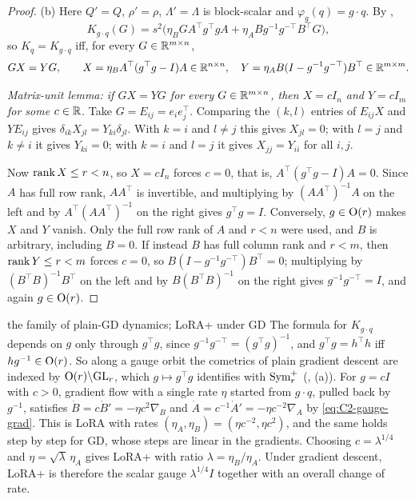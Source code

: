\begin{proof}
(b) Here $Q'=Q$, $\rho'=\rho$, $\Lambda'=\Lambda$ is block-scalar and $\varphi_g(q)=g\cdot q$. By
,
\[K_{g\cdot q}(G)=s^2\big(\eta_BGA^\top g^\top gA+\eta_ABg^{-1}g^{-\top}B^\top G\big),\]
so $K_q=K_{g\cdot q}$ iff, for every $G\in\mathbb{R}^{m\times n}$,
\[GX=YG,\qquad X=\eta_BA^\top(g^\top g-I)A\in\mathbb{R}^{n\times n},\quad Y=\eta_AB(I-g^{-1}g^{-\top})B^\top\in\mathbb{R}^{m\times m}.\]

\emph{Matrix-unit lemma: if $GX=YG$ for every $G\in\mathbb{R}^{m\times n}$, then $X=cI_n$ and $Y=cI_m$ for some $c\in\mathbb{R}$.} Take
$G=E_{ij}=e_ie_j^\top$. Comparing the $(k,l)$ entries of $E_{ij}X$ and $YE_{ij}$ gives $\delta_{ik}X_{jl}=Y_{ki}\delta_{jl}$.
With $k=i$ and $l\ne j$ this gives $X_{jl}=0$; with $l=j$ and $k\ne i$ it gives $Y_{ki}=0$; with $k=i$ and $l=j$ it gives
$X_{jj}=Y_{ii}$ for all $i,j$.

Now $\operatorname{rank} X\le r<n$, so $X=cI_n$ forces $c=0$, that is, $A^\top(g^\top g-I)A=0$. Since $A$ has full row rank, $AA^\top$ is
invertible, and multiplying by $(AA^\top)^{-1}A$ on the left and by $A^\top(AA^\top)^{-1}$ on the right gives
$g^\top g=I$. Conversely, $g\in\mathrm{O}(r)$ makes $X$ and $Y$ vanish. Only the full row rank of $A$ and $r<n$ were used, and
$B$ is arbitrary, including $B=0$. If instead $B$ has full column rank and $r<m$, then $\operatorname{rank} Y\le r<m$ forces $c=0$, so
$B(I-g^{-1}g^{-\top})B^\top=0$; multiplying by $(B^\top B)^{-1}B^\top$ on the left and by $B(B^\top B)^{-1}$ on the right
gives $g^{-1}g^{-\top}=I$, and again $g\in\mathrm{O}(r)$.
\end{proof}

\begin{remark*}{the family of plain-GD dynamics; LoRA+ under GD}
The formula for $K_{g\cdot q}$ depends on $g$ only through $g^\top g$, since $g^{-1}g^{-\top}=(g^\top g)^{-1}$, and
$g^\top g=h^\top h$ iff $hg^{-1}\in\mathrm{O}(r)$. So along a gauge orbit the cometrics of plain gradient descent are indexed by
$\mathrm{O}(r)\backslash\mathrm{GL}_r$, which $g\mapsto g^\top g$ identifies with $\mathrm{Sym}_r^+$ (, (a)). For $g=cI$ with $c>0$,
gradient flow with a single rate $\eta$ started from $g\cdot q$, pulled back by $g^{-1}$, satisfies $\dot B=c\dot B'=-\eta c^2\nabla_B$
and $\dot A=c^{-1}\dot A'=-\eta c^{-2}\nabla_A$ by \eqref{eq:C2-gauge-grad}. This is LoRA with rates
$(\eta_A,\eta_B)=(\eta c^{-2},\eta c^2)$, and the same holds step by step for GD, whose steps are linear in the gradients.
Choosing $c=\lambda^{1/4}$ and $\eta=\sqrt\lambda\,\eta_A$ gives LoRA+ with ratio $\lambda=\eta_B/\eta_A$. Under gradient
descent, LoRA+ is therefore the scalar gauge $\lambda^{1/4}I$ together with an overall change of rate.
\end{remark*}

